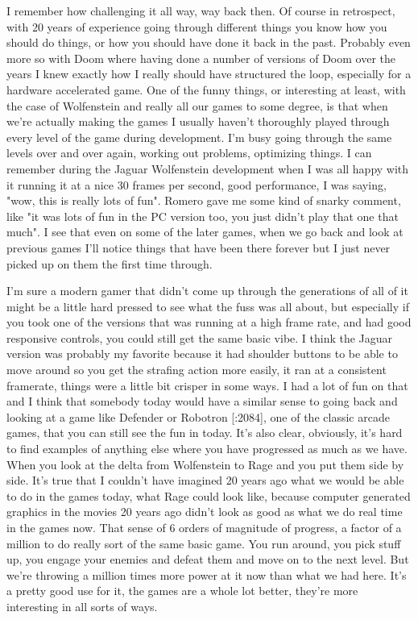 I remember how challenging it all way, way back then. Of course in retrospect, with 20 years of experience going through different things you know how you should do things, or how you should have done it back in the past. Probably even more so with Doom where having done a number of versions of Doom over the years I knew exactly how I really should have structured the loop, especially for a hardware accelerated game. One of the funny things, or interesting at least, with the case of Wolfenstein and really all our games to some degree, is that when we're actually making the games I usually haven't thoroughly played through every level of the game during development. I'm busy going through the same levels over and over again, working out problems, optimizing things. I can remember during the Jaguar Wolfenstein development  when I was all happy with it running it at a nice 30 frames per second, good performance, I was saying, "wow, this is really lots of fun". Romero gave me some kind of snarky comment, like "it was lots of fun in the PC version too, you just didn't play that one that much". I see that even on some of the later games, when we go back and look at previous games I'll notice things that have been there forever but I just never picked up on them the first time through.\\ \par

I'm sure a modern gamer that didn't come up through the generations of all of it might be a little hard pressed to see what the fuss was all about, but especially if you took one of the versions that was running at a high frame rate, and had good responsive controls, you could still get the same basic vibe. I think the Jaguar version was probably my favorite because it had shoulder buttons to be able to move around so you get the strafing action more easily, it ran at a consistent framerate, things were a little bit crisper in some ways. I had a lot of fun on that and I think that somebody today would have a similar sense to going back and looking at a game like Defender or Robotron [:2084], one of the classic arcade games, that you can still see the fun in today. It's also clear, obviously, it's hard to find examples of anything else where you have progressed as much as we have. When you look at the delta from Wolfenstein to Rage and you put them side by side. It's true that I couldn't have imagined 20 years ago what we would be able to do in the games today, what Rage could look like, because computer generated graphics in the movies 20 years ago didn't look as good as what we do real time in the games now. That sense of 6 orders of magnitude of progress, a factor of a million to do really sort of the same basic game. You run around, you pick stuff up, you engage your enemies and defeat them and move on to the next level. But we're throwing a million times more power at it now than what we had here. It's a pretty good use for it, the games are a whole lot better, they're more interesting in all sorts of ways.\\ \par

